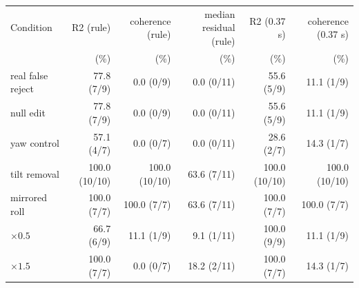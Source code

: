 \footnotesize
\begin{tabular}{lrrrrr}
\toprule
Condition & R2 (rule) & coherence (rule) & median residual (rule) & R2 (0.37 s) & coherence (0.37 s) \\
 & (\%) & (\%) & (\%) & (\%) & (\%) \\
\midrule
real false reject & 77.8 (7/9) & 0.0 (0/9) & 0.0 (0/11) & 55.6 (5/9) & 11.1 (1/9) \\
null edit & 77.8 (7/9) & 0.0 (0/9) & 0.0 (0/11) & 55.6 (5/9) & 11.1 (1/9) \\
yaw control & 57.1 (4/7) & 0.0 (0/7) & 0.0 (0/11) & 28.6 (2/7) & 14.3 (1/7) \\
tilt removal & 100.0 (10/10) & 100.0 (10/10) & 63.6 (7/11) & 100.0 (10/10) & 100.0 (10/10) \\
mirrored roll & 100.0 (7/7) & 100.0 (7/7) & 63.6 (7/11) & 100.0 (7/7) & 100.0 (7/7) \\
$\times 0.5$ & 66.7 (6/9) & 11.1 (1/9) & 9.1 (1/11) & 100.0 (9/9) & 11.1 (1/9) \\
$\times 1.5$ & 100.0 (7/7) & 0.0 (0/7) & 18.2 (2/11) & 100.0 (7/7) & 14.3 (1/7) \\
\bottomrule
\end{tabular}
